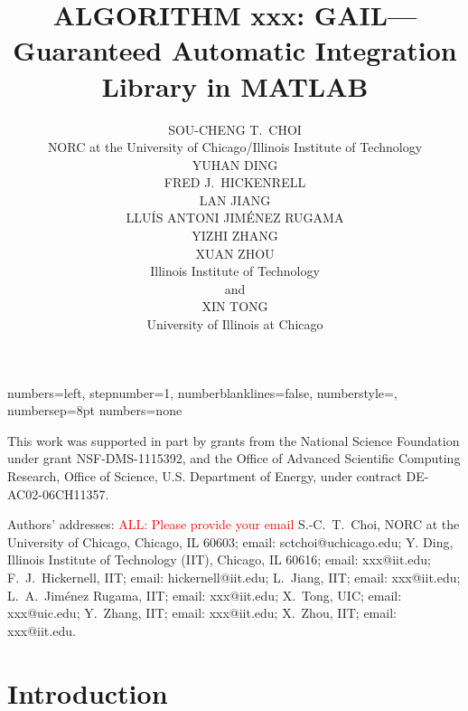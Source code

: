 \documentclass[acmtoms]{doc_acmtrans2m}%
\title{ALGORITHM xxx:
       GAIL---Guaranteed Automatic Integration Library in MATLAB\\     
\note{\small{ALL: Please review title, names, institution, abstract, categories, keywords}}}
\author{SOU-CHENG T.~CHOI
     \\NORC at the University of Chicago/Illinois Institute of Technology
     \\YUHAN DING
     \\FRED J.~HICKENRELL
     \\LAN JIANG
     \\LLU\'{I}S ANTONI JIM\'{E}NEZ RUGAMA
     \\YIZHI ZHANG
     \\XUAN ZHOU
     \\Illinois Institute of  Technology 
     \\and 
     \\XIN TONG  
     \\University of Illinois at Chicago}
\newcommand{\note}[1]{ {\textcolor{red}    { #1 }}}
\begin{document}
{numbers=left, stepnumber=1, numberblanklines=false,
numberstyle=\tiny, numbersep=8pt}
{numbers=none}

\lstset{
language=Matlab,      %
basicstyle=\small,    %
style=numbers,        %
emptylines=*1,        %
breaklines=true,      %
escapeinside=<>,      %
framesep=2.5mm,       %
}


\begin{bottomstuff}
This work was supported in part by grants from
the National Science Foundation under grant NSF-DMS-1115392, and
the Office of Advanced Scientific Computing Research, Office of Science,
U.S. Department of Energy, under contract DE-AC02-06CH11357.


Authors' addresses:\note{ALL: Please provide your email}
%
   S.-C.~T.~Choi, NORC at the University of Chicago,
   Chicago, IL 60603; email: sctchoi@uchicago.edu;
%
   Y. Ding, Illinois Institute of Technology (IIT),
   Chicago, IL 60616; email: xxx@iit.edu;
%
   F.~J.~Hickernell, IIT; email: hickernell@iit.edu;
%
   L.~Jiang, IIT; email: xxx@iit.edu;
%
   L.~A.~Jim\'{e}nez Rugama, IIT; email: xxx@iit.edu;
%
   X.~Tong, UIC; email: xxx@uic.edu;
%
   Y.~Zhang, IIT; email: xxx@iit.edu;
%
   X.~Zhou, IIT; email: xxx@iit.edu.
\end{bottomstuff}

\maketitle



\section{Introduction} \label{sec:intro}
\end{document}
